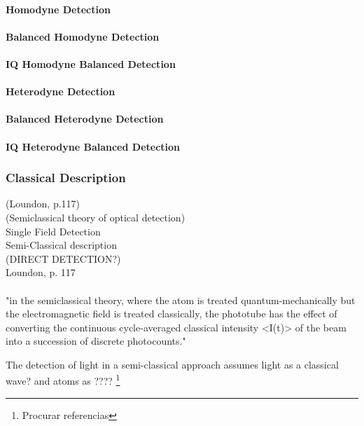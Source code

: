 \paragraph{Homodyne Detection}

\paragraph{Balanced Homodyne Detection}

\paragraph{IQ Homodyne Balanced Detection}

\paragraph{Heterodyne Detection}

\paragraph{Balanced Heterodyne Detection}

\paragraph{IQ Heterodyne Balanced Detection}

\subsubsection{Classical Description}

(Loundon, p.117)\\
(Semiclassical theory of optical detection)\\
Single Field Detection\\
Semi-Classical description\\
(DIRECT DETECTION?)\\
Loundon, p. 117\\
\\

"in the semiclassical theory, where the atom is treated quantum-mechanically but the electromagnetic field is treated classically, the phototube has the effect of converting the continuous cycle-averaged classical intensity <I(t)> of the beam into a succession of discrete photocounts."

The detection of light in a semi-classical approach assumes light as a classical wave? and atoms as ????
\footnote{Procurar referencias}
